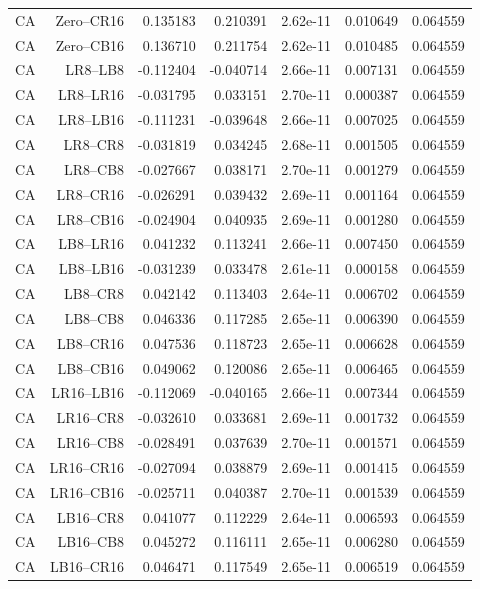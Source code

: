 {\begin{longtable}{lrrrrrr}
CA & Zero--CR16 & 0.135183 & 0.210391 & 2.62e-11 & 0.010649 & 0.064559 \\
CA & Zero--CB16 & 0.136710 & 0.211754 & 2.62e-11 & 0.010485 & 0.064559 \\
CA & LR8--LB8 & -0.112404 & -0.040714 & 2.66e-11 & 0.007131 & 0.064559 \\
CA & LR8--LR16 & -0.031795 & 0.033151 & 2.70e-11 & 0.000387 & 0.064559 \\
CA & LR8--LB16 & -0.111231 & -0.039648 & 2.66e-11 & 0.007025 & 0.064559 \\
CA & LR8--CR8 & -0.031819 & 0.034245 & 2.68e-11 & 0.001505 & 0.064559 \\
CA & LR8--CB8 & -0.027667 & 0.038171 & 2.70e-11 & 0.001279 & 0.064559 \\
CA & LR8--CR16 & -0.026291 & 0.039432 & 2.69e-11 & 0.001164 & 0.064559 \\
CA & LR8--CB16 & -0.024904 & 0.040935 & 2.69e-11 & 0.001280 & 0.064559 \\
CA & LB8--LR16 & 0.041232 & 0.113241 & 2.66e-11 & 0.007450 & 0.064559 \\
CA & LB8--LB16 & -0.031239 & 0.033478 & 2.61e-11 & 0.000158 & 0.064559 \\
CA & LB8--CR8 & 0.042142 & 0.113403 & 2.64e-11 & 0.006702 & 0.064559 \\
CA & LB8--CB8 & 0.046336 & 0.117285 & 2.65e-11 & 0.006390 & 0.064559 \\
CA & LB8--CR16 & 0.047536 & 0.118723 & 2.65e-11 & 0.006628 & 0.064559 \\
CA & LB8--CB16 & 0.049062 & 0.120086 & 2.65e-11 & 0.006465 & 0.064559 \\
CA & LR16--LB16 & -0.112069 & -0.040165 & 2.66e-11 & 0.007344 & 0.064559 \\
CA & LR16--CR8 & -0.032610 & 0.033681 & 2.69e-11 & 0.001732 & 0.064559 \\
CA & LR16--CB8 & -0.028491 & 0.037639 & 2.70e-11 & 0.001571 & 0.064559 \\
CA & LR16--CR16 & -0.027094 & 0.038879 & 2.69e-11 & 0.001415 & 0.064559 \\
CA & LR16--CB16 & -0.025711 & 0.040387 & 2.70e-11 & 0.001539 & 0.064559 \\
CA & LB16--CR8 & 0.041077 & 0.112229 & 2.64e-11 & 0.006593 & 0.064559 \\
CA & LB16--CB8 & 0.045272 & 0.116111 & 2.65e-11 & 0.006280 & 0.064559 \\
CA & LB16--CR16 & 0.046471 & 0.117549 & 2.65e-11 & 0.006519 & 0.064559 \\

\end{longtable}}
